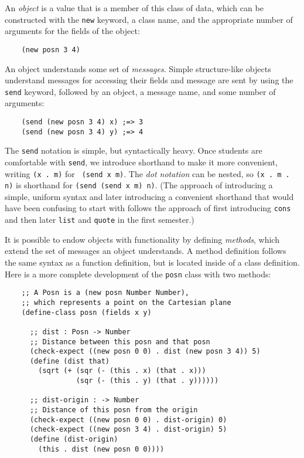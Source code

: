 \documentclass[submission,copyright]{eptcs}
\begin{document}
An \emph{object} is a value that is a member of this class of data,
which can be constructed with the {\tt new} keyword, a class name, and
the appropriate number of arguments for the fields of the object:
\begin{verbatim}
    (new posn 3 4)
\end{verbatim}
An object understands some set of \emph{messages}.  Simple
structure-like objects understand messages for accessing their fields
and message are sent by using the {\tt send} keyword, followed by an object,
a message name, and some number of arguments:
\begin{verbatim}
    (send (new posn 3 4) x) ;=> 3
    (send (new posn 3 4) y) ;=> 4
\end{verbatim}
The {\tt send} notation is simple, but syntactically heavy.  Once
students are comfortable with {\tt send}, we introduce 
shorthand to make it more convenient, writing {\tt (x . m)} for {\tt
  (send x m)}.  The \emph{dot notation} can be nested, so {\tt (x . m
  . n)} is shorthand for {\tt (send (send x m) n)}.  (The approach of
introducing a simple, uniform syntax and later introducing a
convenient shorthand that would have been confusing to start with
follows the approach of first introducing {\tt cons} and then later {\tt list}
and {\tt quote} in the first semester.)


It is possible to endow objects with functionality by defining \emph{methods},
which extend the set of messages an object understands.  A method definition
follows the same syntax as a function definition, but is located inside of a
class definition.  Here is a more complete development of the {\tt posn} class
with two methods:
\begin{verbatim}
    ;; A Posn is a (new posn Number Number),
    ;; which represents a point on the Cartesian plane
    (define-class posn (fields x y)

      ;; dist : Posn -> Number
      ;; Distance between this posn and that posn
      (check-expect ((new posn 0 0) . dist (new posn 3 4)) 5)
      (define (dist that)
        (sqrt (+ (sqr (- (this . x) (that . x)))
                 (sqr (- (this . y) (that . y))))))

      ;; dist-origin : -> Number
      ;; Distance of this posn from the origin
      (check-expect ((new posn 0 0) . dist-origin) 0)
      (check-expect ((new posn 3 4) . dist-origin) 5)
      (define (dist-origin)
        (this . dist (new posn 0 0))))
\end{verbatim}
\end{document}

